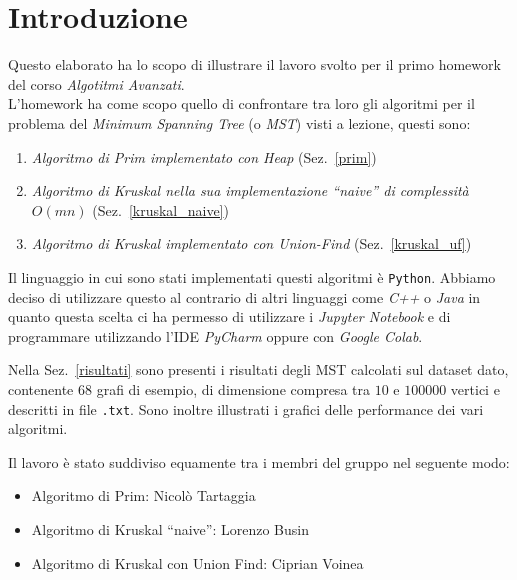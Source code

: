 \section{Introduzione}

Questo elaborato ha lo scopo di illustrare il lavoro svolto per il primo homework del corso \textit{Algotitmi Avanzati}.\\
L'homework ha come scopo quello di confrontare tra loro gli algoritmi per il problema del \textit{Minimum Spanning Tree} (o \textit{MST}) visti a lezione, questi sono:
\begin{enumerate}
	\item \textit{Algoritmo di Prim implementato con Heap} (Sez.~\ref{prim})
	\item \textit{Algoritmo di Kruskal nella sua implementazione ``naive'' di complessità $O(mn)$} (Sez.~\ref{kruskal_naive})
	\item \textit{Algoritmo di Kruskal implementato con Union-Find} (Sez.~\ref{kruskal_uf})
\end{enumerate}

Il linguaggio in cui sono stati implementati questi algoritmi è \texttt{Python}.
Abbiamo deciso di utilizzare questo al contrario di altri linguaggi come \textit{C++} o \textit{Java} in quanto questa scelta ci ha permesso di utilizzare i \textit{Jupyter Notebook} e di programmare utilizzando l'IDE \textit{PyCharm} oppure con \textit{Google Colab}.

Nella Sez.~\ref{risultati} sono presenti i risultati degli MST calcolati sul dataset dato, contenente 68 grafi di esempio, di dimensione compresa tra $10$ e $100000$ vertici e descritti in file \texttt{.txt}.
Sono inoltre illustrati i grafici delle performance dei vari algoritmi.

Il lavoro è stato suddiviso equamente tra i membri del gruppo nel seguente modo:
\begin{itemize}
	\item Algoritmo di Prim: Nicolò Tartaggia
	\item Algoritmo di Kruskal ``naive'': Lorenzo Busin
	\item Algoritmo di Kruskal con Union Find: Ciprian Voinea
\end{itemize}

\pagebreak
